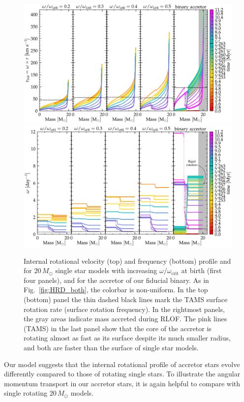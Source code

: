 \documentclass[twocolumn,twocolappendix,trackchanges]{aastex63}
\DeclareRobustCommand{\Figref}[1]{Fig.~\ref{#1}}
\begin{document}
\begin{figure}[tbp]
  \centering
  \includegraphics[width=\textwidth]{zeta_Rotational_struct_colored}
  \includegraphics[width=\textwidth]{omega_struct_colored}
  \caption{Internal rotational velocity (top) and frequency
    (bottom) profile and for $20\,M_\odot$ single star models with
    increasing $\omega/\omega_\mathrm{crit}$ at birth (first four
    panels), and for the accretor of our fiducial binary. As in
    \Figref{fig:HRD_both}, the colorbar is non-uniform. In the top
    (bottom) panel the thin dashed black lines mark the TAMS surface
    rotation rate (surface rotation frequency). In the rightmost
    panels, the gray areas indicate mass accreted during RLOF. The
    pink lines (TAMS) in the last panel show that the core of the
    accretor is rotating almost as fast as its surface despite its
    much smaller radius, and both are faster than the surface of
    single star models.}
  \label{fig:struct_rot}
\end{figure}


Our model suggests that the internal rotational profile of accretor
stars evolve differently compared to those of rotating single stars.
To illustrate the angular momentum transport in our accretor stars, it
is again helpful to compare with single rotating $20\,M_\odot$
models.
\end{document}
